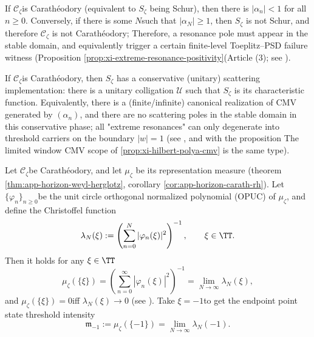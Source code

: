 \begin{theorem}\label{thm:xi-horizon-reflection-finite-witness}
If \(\mathscr{C}_{\zeta}\) ​​is Carath\'eodory (equivalent to \(S_{\zeta}\) being Schur), then there is \(|\alpha_n|<1\) for all \(n\ge 0\).
Conversely, if there is some \(N\) ​​such that \(|\alpha_N|\ge 1\), then \(S_{\zeta}\) is not Schur, and therefore \(\mathscr{C}_{\zeta}\) is not Carath\'eodory;
Therefore, a resonance pole must appear in the stable domain, and equivalently trigger a certain finite-level Toeplitz--PSD failure witness (Proposition \ref{prop:xi-extreme-resonance-positivity} ​​(Article (3); see \cite{Simon2005OPUC1}).
\end{theorem}

\begin{theorem}\label{thm:xi-horizon-conservative-realization}
If \(\mathscr{C}_{\zeta}\) ​​is Carath\'eodory, then \(S_{\zeta}\) has a conservative (unitary) scattering implementation: there is a unitary colligation \(\mathcal U\) such that \(S_{\zeta}\) is its characteristic function.
Equivalently, there is a (finite/infinite) canonical realization of CMV generated by \((\alpha_n)\), and there are no scattering poles in the stable domain in this conservative phase; all "extreme resonances" can only degenerate into threshold carriers on the boundary \(|w|=1\) (see \cite{CanteroMoralVelazquez2003CMV,Simon2005OPUC1}, and with the proposition The limited window CMV scope of \ref{prop:xi-hilbert-polya-cmv} is the same type).
\end{theorem}

\begin{theorem}\label{thm:xi-horizon-endpoint-atom-christoffel}
Let \(\mathscr{C}_{\zeta}\) ​​be Carath\'eodory, and let \(\mu_{\zeta}\) be its representation measure (theorem \ref{thm:app-horizon-weyl-herglotz}, corollary \ref{cor:app-horizon-carath-rh}).
Let \(\{\varphi_n\}_{n\ge 0}\) ​​be the unit circle orthogonal normalized polynomial (OPUC) of \(\mu_{\zeta}\), and define the Christoffel function
\[
\lambda_N(\xi):=\left(\sum_{n=0}^{N}|\varphi_n(\xi)|^2\right)^{-1},\qquad \xi\in\TT.
\]
Then it holds for any \(\xi\in\TT\)
\[
\mu_{\zeta}(\{\xi\})
=\left(\sum_{n=0}^{\infty}|\varphi_n(\xi)|^2\right)^{-1}
=\lim_{N\to\infty}\lambda_N(\xi),
\]
and \(\mu_{\zeta}(\{\xi\})=0\) ​​iff \(\lambda_N(\xi)\to 0\) (see \cite{Simon2005OPUC1}).
Take \(\xi=-1\) ​​to get the endpoint point state threshold intensity
\[
\mathfrak m_{-1}:=\mu_{\zeta}(\{-1\})=\lim_{N\to\infty}\lambda_N(-1).
\]
\end{theorem}

